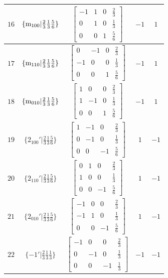 \documentclass[fleqn,8pt]{jsarticle}
\begin{document}
\begin{longtable}{ccccc}
$ 16 $ & $ \{{\rm m}_{100}|\frac{2}{3} \frac{1}{3} \frac{5}{6}\} $ & $ \begin{bmatrix} -1 & 1 & 0 & \frac{2}{3} \\ 0 & 1 & 0 & \frac{1}{3} \\ 0 & 0 & 1 & \frac{5}{6} \end{bmatrix} $ & $ -1 $ & $ 1 $ \\ \hline
$ 17 $ & $ \{{\rm m}_{110}|\frac{2}{3} \frac{1}{3} \frac{5}{6}\} $ & $ \begin{bmatrix} 0 & -1 & 0 & \frac{2}{3} \\ -1 & 0 & 0 & \frac{1}{3} \\ 0 & 0 & 1 & \frac{5}{6} \end{bmatrix} $ & $ -1 $ & $ 1 $ \\ \hline
$ 18 $ & $ \{{\rm m}_{010}|\frac{2}{3} \frac{1}{3} \frac{5}{6}\} $ & $ \begin{bmatrix} 1 & 0 & 0 & \frac{2}{3} \\ 1 & -1 & 0 & \frac{1}{3} \\ 0 & 0 & 1 & \frac{5}{6} \end{bmatrix} $ & $ -1 $ & $ 1 $ \\ \hline
$ 19 $ & $ \{2{}_{100}{}'|\frac{2}{3} \frac{1}{3} \frac{5}{6}\} $ & $ \begin{bmatrix} 1 & -1 & 0 & \frac{2}{3} \\ 0 & -1 & 0 & \frac{1}{3} \\ 0 & 0 & -1 & \frac{5}{6} \end{bmatrix} $ & $ 1 $ & $ -1 $ \\ \hline
$ 20 $ & $ \{2{}_{110}{}'|\frac{2}{3} \frac{1}{3} \frac{5}{6}\} $ & $ \begin{bmatrix} 0 & 1 & 0 & \frac{2}{3} \\ 1 & 0 & 0 & \frac{1}{3} \\ 0 & 0 & -1 & \frac{5}{6} \end{bmatrix} $ & $ 1 $ & $ -1 $ \\ \hline
$ 21 $ & $ \{2{}_{010}{}'|\frac{2}{3} \frac{1}{3} \frac{5}{6}\} $ & $ \begin{bmatrix} -1 & 0 & 0 & \frac{2}{3} \\ -1 & 1 & 0 & \frac{1}{3} \\ 0 & 0 & -1 & \frac{5}{6} \end{bmatrix} $ & $ 1 $ & $ -1 $ \\ \hline
$ 22 $ & $ \{-1{}'|\frac{2}{3} \frac{1}{3} \frac{1}{3}\} $ & $ \begin{bmatrix} -1 & 0 & 0 & \frac{2}{3} \\ 0 & -1 & 0 & \frac{1}{3} \\ 0 & 0 & -1 & \frac{1}{3} \end{bmatrix} $ & $ -1 $ & $ -1 $ \\ \hline

\end{longtable}
\end{document}

